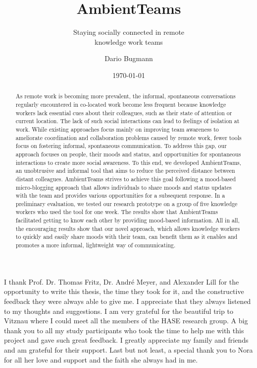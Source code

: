 \documentclass{seal_thesis}
\date{\today}
\title{AmbientTeams}
\subtitle{Staying socially connected in remote \\ knowledge work teams}
\author{Dario Bugmann}
\begin{document}
\maketitle

\frontmatter

\begin{acknowledgements}
    I thank Prof. Dr. Thomas Fritz, Dr. André Meyer, and Alexander Lill for the opportunity to write this thesis, the time they took for it, and the constructive feedback they were always able to give me. I appreciate that they always listened to my thoughts and suggestions. I am very grateful for the beautiful trip to Vitznau where I could meet all the members of the HASE research group. A big thank you to all my study participants who took the time to help me with this project and gave such great feedback. I greatly appreciate my family and friends and am grateful for their support. Last but not least, a special thank you to Nora for all her love and support and the faith she always had in me.
\end{acknowledgements}

\begin{abstract}
    As remote work is becoming more prevalent, the informal, spontaneous conversations regularly encountered in co-located work become less frequent because knowledge workers lack essential cues about their colleagues, such as their state of attention or current location. The lack of such social interactions can lead to feelings of isolation at work. While existing approaches focus mainly on improving team awareness to ameliorate coordination and collaboration problems caused by remote work, fewer tools focus on fostering informal, spontaneous communication. To address this gap, our approach focuses on people, their moods and status, and opportunities for spontaneous interactions to create more social awareness. To this end, we developed AmbientTeams, an unobtrusive and informal tool that aims to reduce the perceived distance between distant colleagues. AmbientTeams strives to achieve this goal following a mood-based micro-blogging approach that allows individuals to share moods and status updates with the team and provides various opportunities for a subsequent response. In a preliminary evaluation, we tested our research prototype on a group of five knowledge workers who used the tool for one week. The results show that AmbientTeams facilitated getting to know each other by providing mood-based information. All in all, the encouraging results show that our novel approach, which allows knowledge workers to quickly and easily share moods with their team, can benefit them as it enables and promotes a more informal, lightweight way of communicating.
\end{abstract}
\end{document}
